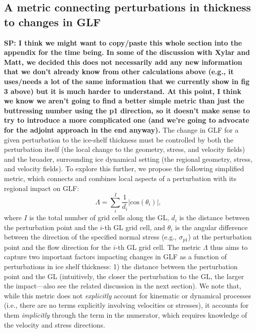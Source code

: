 \documentclass[tc, manuscript]{copernicus}
\begin{document}
\subsection{A metric connecting perturbations in thickness to changes in GLF}
\textbf{SP: I think we might want to copy/paste this whole section into the appendix for the time being. In some of the discussion with Xylar and Matt, we decided this does not necessarily add any new information that we don't already know from other calculations above (e.g., it uses/needs a lot of the same information that we currently show in fig 3 above) but it is much harder to understand. At this point, I think we know we aren't going to find a better simple metric than just the buttressing number using the p1 direction, so it doesn't make sense to try to introduce a more complicated one (and we're going to advocate for the adjoint approach in the end anyway).}
The change in GLF for a given perturbation to the ice-shelf thickness must be controlled by both the perturbation itself (the local change to the geometry, stress, and velocity fields) and the broader, surrounding ice dynamical setting (the regional geometry, stress, and velocity fields). To explore this further, we propose the following simplified metric, which connects and combines local aspects of a perturbation with its regional impact on GLF:
\begin{equation}
    \Lambda = \sum_i^I \frac{1}{d_i} |\mathrm{cos} \left(\theta_i\right)|,
    \label{Lambda}
\end{equation}
where $I$ is the total number of grid cells along the GL, $d_i$ is the distance between the perturbation point and the $i$-th GL grid cell, and $\theta_i$ is the angular difference between the direction of the specified normal stress (e.g., $\sigma_{p1}$) at the perturbation point and the flow direction for the $i$-th GL grid cell. The metric $\Lambda$ thus aims to capture two important factors impacting changes in GLF as a function of perturbations in ice shelf thickness: 1) the distance between the perturbation point and the GL (intuitively, the closer the perturbation to the GL, the larger the impact---also see the related discussion in the next section). We note that, while this metric does not \textit{explicitly} account for kinematic or dynamical processes (i.e., there are no terms explicitly involving velocities or stresses), it accounts for them \textit{implicitly} through the term in the numerator, which requires knowledge of the velocity and stress directions. 
\end{document}
